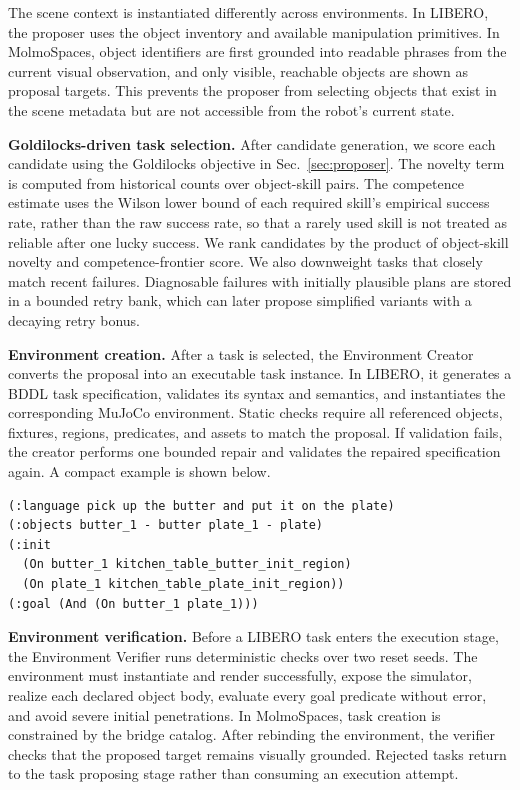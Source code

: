 \documentclass{llmxive}
\begin{document}
The scene context is instantiated differently across environments. In LIBERO,
the proposer uses the object inventory and available manipulation primitives.
In MolmoSpaces, object identifiers are first grounded into readable phrases
from the current visual observation, and only visible, reachable objects are
shown as proposal targets. This prevents the proposer from selecting objects
that exist in the scene metadata but are not accessible from the robot's
current state.

\textbf{Goldilocks-driven task selection.}
After candidate generation, we score each candidate using the Goldilocks
objective in Sec.~\ref{sec:proposer}. The novelty term is computed from
historical counts over object-skill pairs. The competence estimate uses the
Wilson lower bound of each required skill's empirical success rate, rather than
the raw success rate, so that a rarely used skill is not treated as reliable
after one lucky success. We rank candidates by the product of object-skill
novelty and competence-frontier score. We also downweight tasks that closely
match recent failures. Diagnosable failures with initially plausible plans are
stored in a bounded retry bank, which can later propose simplified variants
with a decaying retry bonus.

\textbf{Environment creation.}
After a task is selected, the Environment Creator converts the proposal into an
executable task instance. In LIBERO, it generates a BDDL task specification,
validates its syntax and semantics, and instantiates the corresponding MuJoCo
environment. Static checks require all referenced objects, fixtures, regions,
predicates, and assets to match the proposal. If validation fails, the creator
performs one bounded repair and validates the repaired specification again. A
compact example is shown below.

\begin{verbatim}
(:language pick up the butter and put it on the plate)
(:objects butter_1 - butter plate_1 - plate)
(:init
  (On butter_1 kitchen_table_butter_init_region)
  (On plate_1 kitchen_table_plate_init_region))
(:goal (And (On butter_1 plate_1)))
\end{verbatim}

\textbf{Environment verification.}
Before a LIBERO task enters the execution stage, the Environment Verifier runs
deterministic checks over two reset seeds. The environment must instantiate and
render successfully, expose the simulator, realize each declared object body,
evaluate every goal predicate without error, and avoid severe initial
penetrations. In MolmoSpaces, task creation is constrained by the bridge
catalog. After rebinding the environment, the verifier checks that the proposed
target remains visually grounded. Rejected tasks return to the task proposing stage
rather than consuming an execution attempt.
\end{document}
